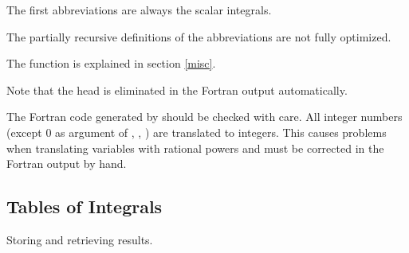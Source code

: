 {The first abbreviations are always the scalar integrals.

The partially recursive definitions of the 
abbreviations are not fully optimized. 

The function  is explained in section \ref{misc}.

Note that the head  is eliminated in the 
Fortran output automatically.
}
\enom
The Fortran code generated by  should be checked with care.
All integer numbers (except 0 as argument of , , ) 
are translated to integers. This causes problems when translating 
variables with rational powers and must be corrected in the Fortran 
output by hand.

\subsection{Tables of Integrals}

 {Storing and retrieving results.}


